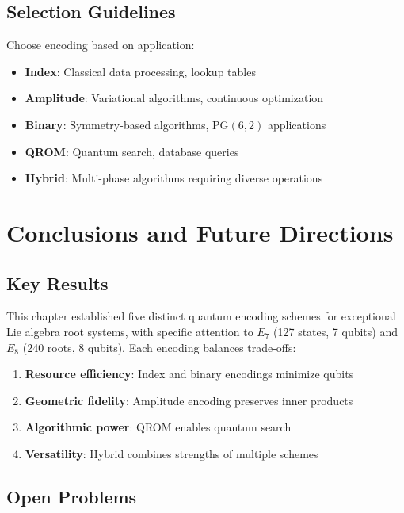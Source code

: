 \subsection{Selection Guidelines}

\begin{proposition}
\label{prop:encoding_selection}
Choose encoding based on application:
\begin{itemize}
    \item \textbf{Index}: Classical data processing, lookup tables
    \item \textbf{Amplitude}: Variational algorithms, continuous optimization
    \item \textbf{Binary}: Symmetry-based algorithms, PG$(6,2)$ applications
    \item \textbf{QROM}: Quantum search, database queries
    \item \textbf{Hybrid}: Multi-phase algorithms requiring diverse operations
\end{itemize}
\end{proposition}

\section{Conclusions and Future Directions}

\subsection{Key Results}

This chapter established five distinct quantum encoding schemes for exceptional Lie algebra root systems, with specific attention to $E_7$ (127 states, 7 qubits) and $E_8$ (240 roots, 8 qubits). Each encoding balances trade-offs:

\begin{enumerate}
    \item \textbf{Resource efficiency}: Index and binary encodings minimize qubits
    \item \textbf{Geometric fidelity}: Amplitude encoding preserves inner products
    \item \textbf{Algorithmic power}: QROM enables quantum search
    \item \textbf{Versatility}: Hybrid combines strengths of multiple schemes
\end{enumerate}

\subsection{Open Problems}

